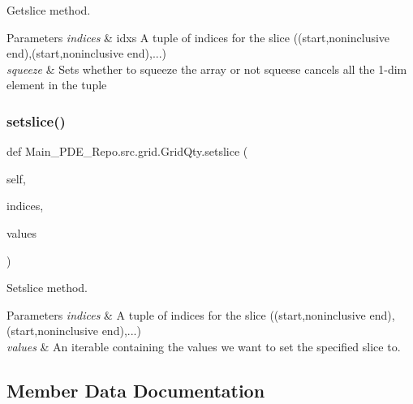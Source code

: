 Getslice method. 


\begin{DoxyParams}{Parameters}
{\em indices} & idxs A tuple of indices for the slice ((start,noninclusive end),(start,noninclusive end),...) \\
\hline
{\em squeeze} & Sets whether to squeeze the array or not squeese cancels all the 1-\/dim element in the tuple \\
\hline
\end{DoxyParams}
\mbox{\label{classMain__PDE__Repo_1_1src_1_1grid_1_1GridQty_a991e5653e03be1daeabfd5dd512fd75c}} 
\subsubsection{\texorpdfstring{setslice()}{setslice()}}
{\footnotesize\ttfamily def Main\+\_\+\+P\+D\+E\+\_\+\+Repo.\+src.\+grid.\+Grid\+Qty.\+setslice (\begin{DoxyParamCaption}\item[{}]{self,  }\item[{}]{indices,  }\item[{}]{values }\end{DoxyParamCaption})}



Setslice method. 


\begin{DoxyParams}{Parameters}
{\em indices} & A tuple of indices for the slice ((start,noninclusive end),(start,noninclusive end),...) \\
\hline
{\em values} & An iterable containing the values we want to set the specified slice to. \\
\hline
\end{DoxyParams}


\subsection{Member Data Documentation}
\mbox{\label{classMain__PDE__Repo_1_1src_1_1grid_1_1GridQty_ad506c5469e4f07ccdcd1cca7239d1555}} 
